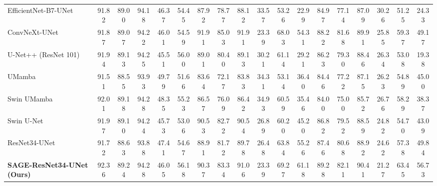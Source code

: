 \begin{table}[t]
{\begin{tabular}{l|ccccc|cccccc|cccccc}
EfficientNet-B7-UNet \cite{ronneberger2015unetconvolutionalnetworksbiomedical, tan2020efficientnetrethinkingmodelscaling} 
& 91.82 & 89.00 & 94.18 & 46.37 & 54.45 
& 87.92 & 78.77 & 88.12 & 33.57 & 53.26 & 22.99 
& 84.97 & 77.14 & 87.09 & 30.26 & 51.25 & 24.33 \\

ConvNeXt-UNet \cite{ronneberger2015unetconvolutionalnetworksbiomedical, ConvNext} 
& 91.87 & 89.07 & 94.22 & 46.01 & 54.59 
& \cellcolor{SecondBestColor}\textcolor{SecondBestTextColor}{91.91} & \cellcolor{SecondBestColor}\textcolor{SecondBestTextColor}{85.03} & \cellcolor{SecondBestColor}\textcolor{SecondBestTextColor}{91.91} & \cellcolor{SecondBestColor}\textcolor{SecondBestTextColor}{23.39} & 68.03 & 54.31
& 88.22 & 81.68 & 89.91 & 25.85 & 59.37 & 49.17 \\

U-Net++ (ResNet 101) \cite{zhou2018unet++} 
& 91.94 & 89.13 & 94.25 & \cellcolor{SecondBestColor}\textcolor{SecondBestTextColor}{45.51} & 56.00 
& 89.01 & 80.40 & 89.13 & 30.21 & 61.14 & 29.21 
& 86.23 & 79.30 & 88.46 & 26.34 & 53.08 & 19.38 \\

UMamba \cite{ma2024u} 
& 91.51 & 88.55 & 93.93 & 49.79 & 51.66 
& 83.64 & 72.17 & 83.83 & 34.31 & 53.14 & 36.40 
& 84.46 & 77.22 & 87.15 & 26.23 & 54.89 & 45.00 \\

Swin UMamba \cite{liu2024swin} 
& 92.01 & 89.18 & \cellcolor{SecondBestColor}\textcolor{SecondBestTextColor}{94.28} & 48.35 & 55.23 
& 86.57 & 76.09 & 86.42 & 34.93 & 60.59 & 35.46 
& 84.00 & 75.00 & 85.72 & 26.76 & 58.29 & 38.37 \\

Swin U-Net \cite{cao2022swin} 
& 91.97 & 89.10 & 94.24 & 45.73 & 53.06 
& 90.53 & 82.72 & 90.54 & 26.89 & 60.20 & 45.20 
& 86.82 & 79.52 & 88.59 & 24.82 & 54.70 & 43.09 \\

\midrule

ResNet34-UNet \cite{ronneberger2015unetconvolutionalnetworksbiomedical, he2015deepresiduallearningimage}
& 91.72 & 88.63 & 93.88 & 47.41 & 54.67 
& 88.91 & 81.72 & 89.78 & 26.48 & 63.84 & 55.26 
& 87.46 & 80.68 & 88.92 & 24.62 & 57.38 & 49.84 \\

\textbf{SAGE-ResNet34-UNet (Ours)}
& 92.36 & \cellcolor{SecondBestColor}\textcolor{SecondBestTextColor}{89.24} & \cellcolor{SecondBestColor}\textcolor{SecondBestTextColor}{94.28} & 46.05 & \cellcolor{SecondBestColor}\textcolor{SecondBestTextColor}{56.18} 
& 90.37 & 83.34 & 91.06 & \cellcolor{SecondBestColor}\textcolor{SecondBestTextColor}{23.39} & 69.27 & 61.18 
& 89.28 & \cellcolor{SecondBestColor}\textcolor{SecondBestTextColor}{82.11} & \cellcolor{SecondBestColor}\textcolor{SecondBestTextColor}{90.41} & \cellcolor{SecondBestColor}\textcolor{SecondBestTextColor}{21.27} & 63.45 & 56.73 \\


\end{tabular}}
\end{table}
